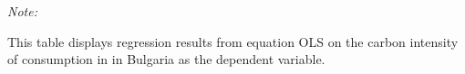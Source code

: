 \begin{table}[htbp!]
\begin{adjustbox}{width = 1\textwidth, max height = 0.95\textheight, center}
\begin{threeparttable}[b]
         \begin{tablenotes}\item \medskip \textit{Note:}
            \item This table displays regression results from equation OLS on the carbon intensity of consumption in  in Bulgaria as the dependent variable. 
         \end{tablenotes}
      \end{threeparttable}
   \end{adjustbox}
\end{table}


